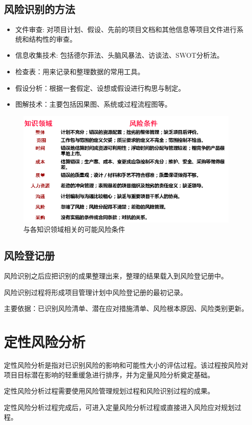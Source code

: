 \subsection{风险识别的方法}
\begin{itemize}
	\item 文件审查: 对项目计划、假设、先前的项目文档和其他信息等项目文件进行系统和结构性的审查。
	\item 信息收集技术: 包括德尔菲法、头脑风暴法、访谈法、SWOT分析法。
	\item 检查表：用来记录和整理数据的常用工具。
	\item 假设分析：根据一套假定、设想或假设进行构思与制定。
	\item 图解技术：主要包括因果图、系统或过程流程图等。
\end{itemize}
\begin{figure}[!h]
	\centering
	\includegraphics[width=\textwidth]{image/10-2}
	\caption{与各知识领域相关的可能风险条件}
\end{figure}
\subsection{风险登记册}
风险识别之后应把识别的成果整理出来，整理的结果载入到风险登记册中。
\par 风险识别过程将形成项目管理计划中风险登记册的最初记录。
\par 主要依据：已识别风险清单、潜在应对措施清单、风险根本原因、风险类别更新。
\section{定性风险分析}
定性风险分析是指对已识别风险的影响和可能性大小的评估过程。该过程按风险对项目目标潜在影响的轻重缓急进行排序，并为定量风险分析奠定基础。
\par 定性风险分析过程需要使用风险管理规划过程和风险识别过程的成果。
\par 定性风险分析过程完成后，可进入定量风险分析过程或直接进入风险应对规划过程。
